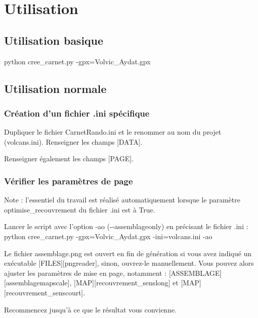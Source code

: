 \documentclass[12pt,french]{article}
\begin{document}
\section{Utilisation}
\subsection{Utilisation basique}
python cree\_carnet.py -gpx=Volvic\_Aydat.gpx
\subsection{Utilisation normale}
\subsubsection{Création d'un fichier .ini spécifique}
Dupliquer le fichier CarnetRando.ini et le renommer au nom du projet (volcans.ini). Renseigner les champs [DATA].\par 
Renseigner également les champs [PAGE].
\subsubsection{Vérifier les paramètres de page}
Note : l'essentiel du travail est réalisé automatiquement lorsque le paramètre optimise\_recouvrement du fichier .ini est à True.\par
Lancer le script avec l'option -ao (-\mbox{}-assemblageonly) en précisant le fichier .ini :\\
python cree\_carnet.py -gpx=Volvic\_Aydat.gpx -ini=volcans.ini -ao\par
Le fichier assemblage.png est ouvert en fin de génération si vous avez indiqué un exécutable [FILES][pngreader], sinon, ouvrez-le manuellement. Vous pouvez alors ajuster les paramètres de mise en page, notamment : [ASSEMBLAGE][assemblagemapscale], [MAP][recouvrement\_senslong] et [MAP][recouvrement\_senscourt].\par 
Recommencez jusqu'à ce que le résultat vous convienne.
\end{document}
